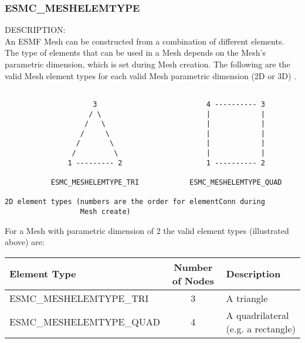 
\subsubsection{ESMC\_MESHELEMTYPE}
\label{const:cmeshelemtype}

 {\sf DESCRIPTION:\\}
 An ESMF Mesh can be constructed from a combination of different elements. The type of elements that can
be used in a Mesh depends on the Mesh's parametric dimension, which is set during Mesh creation. The
following are the valid Mesh element types for each valid Mesh parametric dimension (2D or 3D) .

\medskip

\begin{verbatim}

                     3                          4 ---------- 3
                    / \                         |            |  
                   /   \                        |            |
                  /     \                       |            |
                 /       \                      |            |
                /         \                     |            |
               1 --------- 2                    1 ---------- 2

           ESMC_MESHELEMTYPE_TRI            ESMC_MESHELEMTYPE_QUAD

2D element types (numbers are the order for elementConn during 
                  Mesh create)

\end{verbatim}

For a Mesh with parametric dimension of 2 the valid element types (illustrated above) are:

\smallskip

\begin{tabular}{|l|c|l|}
\hline
Element Type &  Number of Nodes  & Description \\
\hline
ESMC\_MESHELEMTYPE\_TRI  & 3 & A triangle \\
ESMC\_MESHELEMTYPE\_QUAD & 4 & A quadrilateral (e.g. a rectangle) \\
\hline
\end{tabular}

\medskip
\medskip

